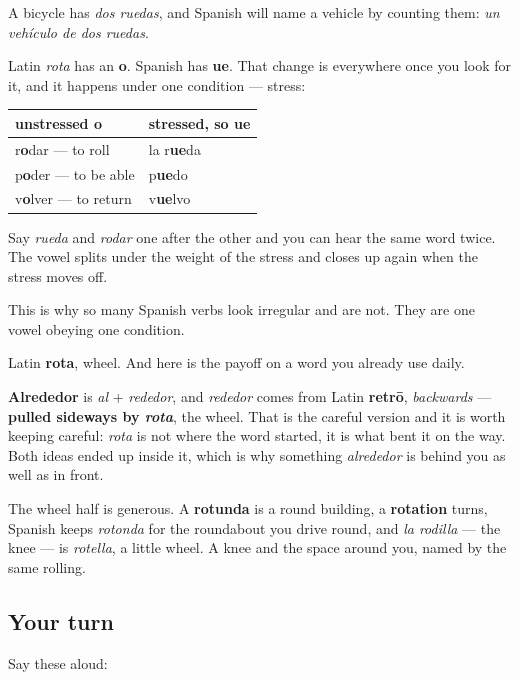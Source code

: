 A bicycle has \emph{dos ruedas}, and Spanish will name a vehicle by counting them: \emph{un vehículo de dos ruedas}.

\begin{grammarlens}[title={Grammar Lens: the o that breaks in two}]
Latin \emph{rota} has an \textbf{o}. Spanish has \textbf{ue}. That change is everywhere once you look for it, and it happens under one condition — stress:

\noindent
\begin{tabularx}{\linewidth}{@{}>{\raggedright\arraybackslash}X>{\raggedright\arraybackslash}X@{}}
\toprule
\textbf{unstressed o} & \textbf{stressed, so ue} \\
\midrule
r\textbf{o}dar — to roll & la r\textbf{ue}da \\
p\textbf{o}der — to be able & p\textbf{ue}do \\
v\textbf{o}lver — to return & v\textbf{ue}lvo \\
\bottomrule
\end{tabularx}

Say \emph{rueda} and \emph{rodar} one after the other and you can hear the same word twice. The vowel splits under the weight of the stress and closes up again when the stress moves off.

This is why so many Spanish verbs look irregular and are not. They are one vowel obeying one condition.
\end{grammarlens}

\begin{cousinweb}
Latin \textbf{rota}, wheel. And here is the payoff on a word you already use daily.

\textbf{Alrededor} is \emph{al} + \emph{rededor}, and \emph{rededor} comes from Latin \textbf{retrō}, \emph{backwards} — \textbf{pulled sideways by \emph{rota}}, the wheel. That is the careful version and it is worth keeping careful: \emph{rota} is not where the word started, it is what bent it on the way. Both ideas ended up inside it, which is why something \emph{alrededor} is behind you as well as in front.

The wheel half is generous. A \textbf{rotunda} is a round building, a \textbf{rotation} turns, Spanish keeps \emph{rotonda} for the roundabout you drive round, and \emph{la rodilla} — the knee — is \emph{rotella}, a little wheel. A knee and the space around you, named by the same rolling.
\end{cousinweb}

\subsection*{Your turn}
Say these aloud:

